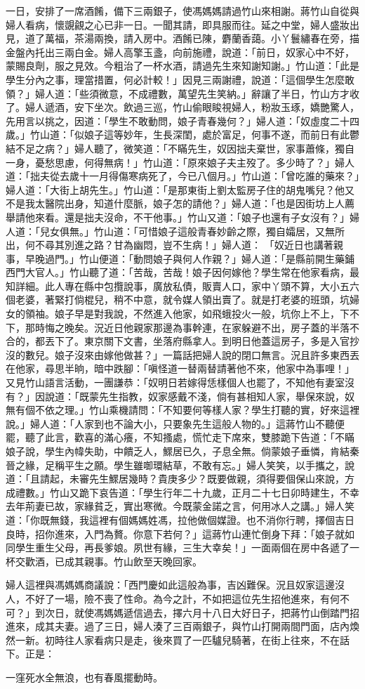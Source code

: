 一日，安排了一席酒餚，備下三兩銀子，使馮媽媽請過竹山來相謝。蔣竹山自從與婦人看病，懷覬覦之心已非一日。一聞其請，即具服而往。延之中堂，婦人盛妝出見，道了萬福，茶湯兩換，請入房中。酒餚已陳，麝蘭香藹。小丫鬟繡春在旁，描金盤內托出三兩白金。婦人高擎玉盞，向前施禮，說道：「前日，奴家心中不好，蒙賜良劑，服之見效。今粗治了一杯水酒，請過先生來知謝知謝。」竹山道：「此是學生分內之事，理當措置，何必計較！」因見三兩謝禮，說道：「這個學生怎麼敢領？」婦人道：「些須微意，不成禮數，萬望先生笑納。」辭讓了半日，竹山方才收了。婦人遞酒，安下坐次。飲過三巡，竹山偷眼睃視婦人，粉妝玉琢，嬌艷驚人，先用言以挑之，因道：「學生不敢動問，娘子青春幾何？」婦人道：「奴虛度二十四歲。」竹山道：「似娘子這等妙年，生長深閨，處於富足，何事不遂，而前日有此鬱結不足之病？」婦人聽了，微笑道：「不瞞先生，奴因拙夫棄世，家事蕭條，獨自一身，憂愁思慮，何得無病！」竹山道：「原來娘子夫主歿了。多少時了？」婦人道：「拙夫從去歲十一月得傷寒病死了，今已八個月。」竹山道：「曾吃誰的藥來？」婦人道：「大街上胡先生。」竹山道：「是那東街上劉太監房子住的胡鬼嘴兒？他又不是我太醫院出身，知道什麼脈，娘子怎的請他？」婦人道：「也是因街坊上人薦舉請他來看。還是拙夫沒命，不干他事。」竹山又道：「娘子也還有子女沒有？」婦人道：「兒女俱無。」竹山道：「可惜娘子這般青春妙齡之際，獨自孀居，又無所出，何不尋其別進之路？甘為幽悶，豈不生病！」婦人道： 「奴近日也講著親事，早晚過門。」竹山便道：「動問娘子與何人作親？」婦人道：「是縣前開生藥鋪西門大官人。」竹山聽了道：「苦哉，苦哉！娘子因何嫁他？學生常在他家看病，最知詳細。此人專在縣中包攬說事，廣放私債，販賣人口，家中丫頭不算，大小五六個老婆，著緊打倘棍兒，稍不中意，就令媒人領出賣了。就是打老婆的班頭，坑婦女的領袖。娘子早是對我說，不然進入他家，如飛蛾投火一般，坑你上不上，下不下，那時悔之晚矣。況近日他親家那邊為事幹連，在家躲避不出，房子蓋的半落不合的，都丟下了。東京關下文書，坐落府縣拿人。到明日他蓋這房子，多是入官抄沒的數兒。娘子沒來由嫁他做甚？」一篇話把婦人說的閉口無言。況且許多東西丟在他家，尋思半晌，暗中跌腳：「嗔怪道一替兩替請著他不來，他家中為事哩！」又見竹山語言活動，一團謙恭：「奴明日若嫁得恁樣個人也罷了，不知他有妻室沒有？」因說道：「既蒙先生指教，奴家感戴不淺，倘有甚相知人家，舉保來說，奴無有個不依之理。」竹山乘機請問：「不知要何等樣人家？學生打聽的實，好來這裡說。」婦人道：「人家到也不論大小，只要象先生這般人物的。」這蔣竹山不聽便罷，聽了此言，歡喜的滿心癢，不知搔處，慌忙走下席來，雙膝跪下告道：「不瞞娘子說，學生內幃失助，中饋乏人，鰥居已久，子息全無。倘蒙娘子垂憐，肯結秦晉之緣，足稱平生之願。學生雖啣環結草，不敢有忘。」婦人笑笑，以手攜之，說道：「且請起，未審先生鰥居幾時？貴庚多少？既要做親，須得要個保山來說，方成禮數。」竹山又跪下哀告道：「學生行年二十九歲，正月二十七日卯時建生，不幸去年荊妻已故，家緣貧乏，實出寒微。今既蒙金諾之言，何用冰人之講。」婦人笑道：「你既無錢，我這裡有個媽媽姓馮，拉他做個媒證。也不消你行聘，擇個吉日良時，招你進來，入門為贅。你意下若何？」這蔣竹山連忙倒身下拜：「娘子就如同學生重生父母，再長爹娘。夙世有緣，三生大幸矣！」一面兩個在房中各遞了一杯交歡酒，已成其親事。竹山飲至天晚回家。

婦人這裡與馮媽媽商議說：「西門慶如此這般為事，吉凶難保。況且奴家這邊沒人，不好了一場，險不喪了性命。為今之計，不如把這位先生招他進來，有何不可？」到次日，就使馮媽媽遞信過去，擇六月十八日大好日子，把蔣竹山倒踏門招進來，成其夫妻。過了三日，婦人湊了三百兩銀子，與竹山打開兩間門面，店內煥然一新。初時往人家看病只是走，後來買了一匹驢兒騎著，在街上往來，不在話下。正是：

一窪死水全無浪，也有春風擺動時。

